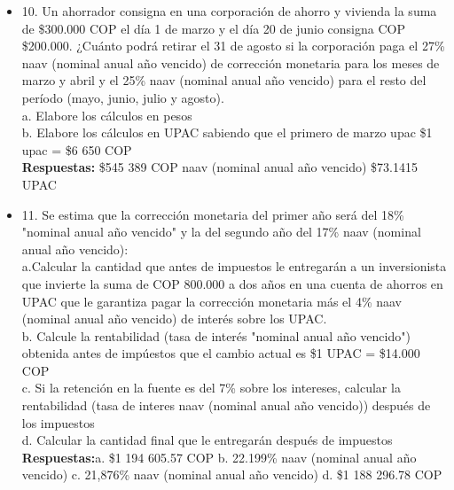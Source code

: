 \begin{itemize}
 \item 10. Un ahorrador consigna en una corporación de ahorro y vivienda la suma de \$300.000 COP el día 1 de  marzo y el día 20 de junio consigna COP \$200.000.  ¿Cuánto  podrá  retirar  el  31  de  agosto  si la corporación  paga el  27\% naav (nominal anual año vencido) de corrección monetaria para los meses de marzo y abril y el 25\% naav (nominal anual año vencido)  para el resto del período (mayo, junio, julio y agosto).\\
       a. Elabore los cálculos en pesos\\
       b. Elabore los cálculos en UPAC sabiendo que el primero de marzo upac \$1 upac = \$6 650 COP\\
       \textbf{Respuestas:} \$545 389 COP naav (nominal anual año vencido)\hspace{0,5cm} \$73.1415 UPAC\\
       \medskip

 \item 11. Se estima que la corrección monetaria del primer año será del 18\% "nominal anual año vencido" y la del segundo año del 17\% naav (nominal anual año vencido):\\
       a.Calcular la cantidad que antes de impuestos le entregarán a un inversionista que invierte la suma de COP 800.000 a dos años en una cuenta de ahorros en UPAC que le garantiza pagar la corrección monetaria más el 4\% naav (nominal anual año vencido) de interés sobre los UPAC.\\
       b. Calcule la rentabilidad (tasa de interés "nominal anual año vencido") obtenida antes de impúestos que el cambio actual es \$1 UPAC = \$14.000 COP\\
       c. Si la retención en la fuente es del 7\% sobre los intereses, calcular la rentabilidad (tasa de interes naav (nominal anual año vencido)) después de los impuestos\\
       d. Calcular la cantidad final que le entregarán después de impuestos\\
       \textbf{Respuestas:}a. \$1 194 605.57 COP \hspace{0,5cm} b. 22.199\% naav (nominal anual año vencido)\hspace{0,5cm} c. 21,876\% naav (nominal anual año vencido)\hspace{0,5cm} d. \$1 188 296.78 COP\\
       \medskip


\end{itemize}

